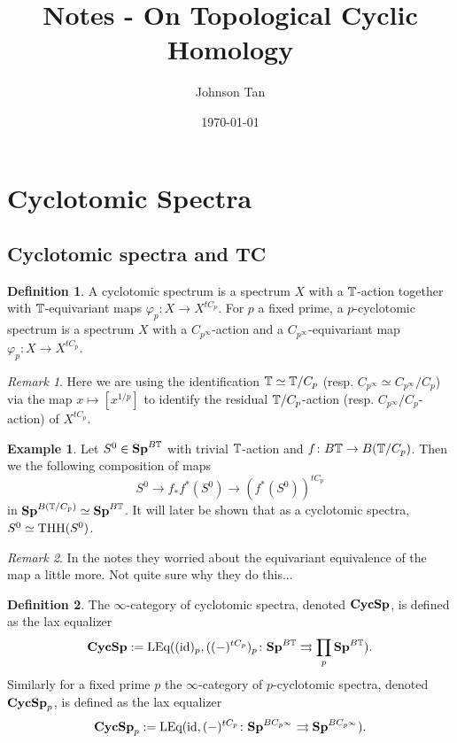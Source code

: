 \documentclass[letterpaper]{article}
\theoremstyle{definition}
\newtheorem{definition}{Definition}[section]
\newtheorem{ex}{Example}
\theoremstyle{remark}
\newtheorem{remark}{Remark}
\theoremstyle{plain}
\begin{document}
\title{Notes - On Topological Cyclic Homology}
\author{Johnson Tan}
\date{\today}
\maketitle

\tableofcontents

\section{Cyclotomic Spectra}

\subsection{Cyclotomic spectra and TC}

\begin{definition}
		A cyclotomic spectrum is a spectrum $X$ with a $\mathbb{T}$-action together with $\mathbb{T}$-equivariant maps $\varphi_p\colon X\rightarrow X^{tC_p}$. For $p$ a fixed prime, a $p$-cyclotomic spectrum is a spectrum $X$ with a $C_{p^\infty}$-action and a $C_{p^\infty}$-equivariant map $\varphi_p\colon X\rightarrow X^{tC_p}$.
\end{definition}

\begin{remark}
		Here we are using the identification $\mathbb{T}\simeq\mathbb{T}/C_p$ (resp. $C_{p^\infty}\simeq C_{p^\infty}/C_p$) via the map $x\mapsto[x^{1/p}]$ to identify the residual $\mathbb{T}/C_p$-action (resp. $C_{p^\infty}/C_p$-action) of $X^{tC_p}$.
\end{remark}

\begin{ex}
		Let $S^0\in\mathbf{Sp}^{B\mathbb{T}}$ with trivial $\mathbb{T}$-action and $f\colon B\mathbb{T}\rightarrow B(\mathbb{T}/C_p)$. Then we the following composition of maps
$$S^0\rightarrow f_*f^*(S^0)\rightarrow(f^*(S^0))^{tC_p}$$
		in $\mathbf{Sp}^{B(\mathbb{T}/C_p)}\simeq\mathbf{Sp}^{B\mathbb{T}}$. It will later be shown that as a cyclotomic spectra, $S^0\simeq\textnormal{THH}(S^0)$.
\end{ex}

\begin{remark}
		In the notes they worried about the equivariant equivalence of the map a little more. Not quite sure why they do this...
\end{remark}

\begin{definition}
		The $\infty$-category of cyclotomic spectra, denoted $\mathbf{CycSp}$, is defined as the lax equalizer
		$$\mathbf{CycSp} := \textnormal{LEq}((\textnormal{id})_p,((-)^{tC_p})_p\colon\mathbf{Sp}^{B\mathbb{T}}\rightrightarrows\prod_p\mathbf{Sp}^{B\mathbb{T}}).$$
		Similarly for a fixed prime $p$ the $\infty$-category of $p$-cyclotomic spectra, denoted $\mathbf{CycSp}_p$, is defined as the lax equalizer
		$$\mathbf{CycSp}_p := \textnormal{LEq}(\textnormal{id},(-)^{tC_p}\colon\mathbf{Sp}^{BC_{p^\infty}}\rightrightarrows\mathbf{Sp}^{BC_{p^\infty}}).$$
\end{definition}
\end{document}
